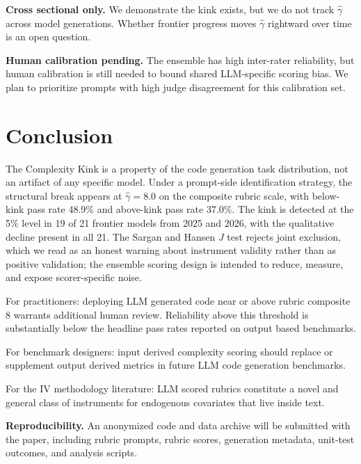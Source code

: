 \documentclass{article}
\begin{document}
\textbf{Cross sectional only.} We demonstrate the kink exists, but we do not track $\hat{\gamma}$ across model generations. Whether frontier progress moves $\hat{\gamma}$ rightward over time is an open question.

\textbf{Human calibration pending.} The ensemble has high inter-rater reliability, but human calibration is still needed to bound shared LLM-specific scoring bias. We plan to prioritize prompts with high judge disagreement for this calibration set.

\section{Conclusion}

The Complexity Kink is a property of the code generation task distribution, not an artifact of any specific model. Under a prompt-side identification strategy, the structural break appears at $\hat{\gamma}=8.0$ on the composite rubric scale, with below-kink pass rate 48.9\% and above-kink pass rate 37.0\%. The kink is detected at the 5\% level in 19 of 21 frontier models from 2025 and 2026, with the qualitative decline present in all 21. The Sargan and Hansen $J$ test rejects joint exclusion, which we read as an honest warning about instrument validity rather than as positive validation; the ensemble scoring design is intended to reduce, measure, and expose scorer-specific noise.

For practitioners: deploying LLM generated code near or above rubric composite 8 warrants additional human review. Reliability above this threshold is substantially below the headline pass rates reported on output based benchmarks.

For benchmark designers: input derived complexity scoring should replace or supplement output derived metrics in future LLM code generation benchmarks.

For the IV methodology literature: LLM scored rubrics constitute a novel and general class of instruments for endogenous covariates that live inside text.

\vspace{4pt}
\noindent\textbf{Reproducibility.} An anonymized code and data archive will be submitted with the paper, including rubric prompts, rubric scores, generation metadata, unit-test outcomes, and analysis scripts.
\end{document}
